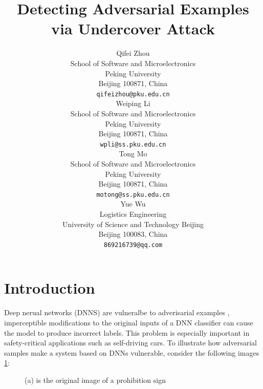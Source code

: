 \documentclass{article}
\title{Detecting Adversarial Examples via Undercover Attack}
\author{%
  Qifei Zhou \\ %
  School of Software and Microelectronics\\
  Peking University\\
  Beijing 100871, China \\
  \texttt{qifeizhou@pku.edu.cn} \\
  \And
  Weiping Li \\
  School of Software and Microelectronics\\
  Peking University\\
  Beijing 100871, China \\
  \texttt{wpli@ss.pku.edu.cn} \\
  \AND
  Tong Mo \\
  School of Software and Microelectronics\\
  Peking University\\
  Beijing 100871, China \\
  \texttt{motong@ss.pku.edu.cn} \\
  \And
  Yue Wu \\
  Logistics Engineering \\
  University of Science and Technology Beijing \\
  Beijing 100083, China \\
  \texttt{869216739@qq.com} \\
}
\begin{document}

\maketitle

\begin{abstract}

\end{abstract}

\section{Introduction}

Deep nerual networks (DNNS) are vulneralbe to adverisarial examples \cite{Szegedy2013Intriguing,Goodfellow2014Explaining,Papernot2016Transferability}, imperceptible modifications to the original inputs of a DNN classifier can cause the model to produce incorrect labels. This problem is especially important in safety-critical applications such as self-driving cars. To illustrate how adversarial samples make a system based on DNNs vulnerable, consider the following 
images \ref{car}:

\begin{figure}[h]
  \centerline{
  }
  \caption{(a) is the original image of a prohibition sign}
  \label{car}
\end{figure}
\end{document}
